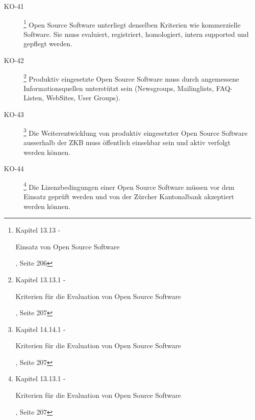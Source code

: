 \begin{description}
    \item[KO-41\label{itm:KO-41}]
    \footnote{\cite{ZkbHandbuchDerItArchitektur} Kapitel 13.13 -
    \begin{itshape}Einsatz von Open Source Software\end{itshape}, Seite 206}
    Open Source Software unterliegt denselben Kriterien wie kommerzielle
    Software. Sie muss evaluiert, registriert, homologiert, intern supported
    und gepflegt werden.    
    
    \item[KO-42\label{itm:KO-42}]
    \footnote{\cite{ZkbHandbuchDerItArchitektur} Kapitel 13.13.1 -
    \begin{itshape}Kriterien für die Evaluation von Open Source
    Software\end{itshape}, Seite 207}
    Produktiv eingesetzte Open Source Software muss durch angemessene
    Informationsquellen unterstützt sein (Newsgroups, Mailinglists,
    FAQ-Listen, WebSites, User Groups).    
    
    \item[KO-43\label{itm:KO-43}]
    \footnote{\cite{ZkbHandbuchDerItArchitektur} Kapitel 14.14.1 -
    \begin{itshape}Kriterien für die Evaluation von Open Source
    Software\end{itshape}, Seite 207}
    Die Weiterentwicklung von produktiv eingesetzter Open Source Software
    ausserhalb der ZKB muss öffentlich einsehbar sein und aktiv verfolgt werden
    können.
    
    \item[KO-44\label{itm:KO-44}]
    \footnote{\cite{ZkbHandbuchDerItArchitektur} Kapitel 13.13.1 -
    \begin{itshape}Kriterien für die Evaluation von Open Source
    Software\end{itshape}, Seite 207}
    Die Lizenzbedingungen einer Open Source Software müssen vor dem Einsatz
    geprüft werden und von der Zürcher Kantonalbank akzeptiert werden können.
  \end{description}